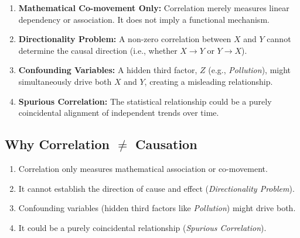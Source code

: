 \documentclass[12pt,a4paper]{article}
\begin{document}
\begin{tcolorbox}[
colback=gray!5,
colframe=black!75,
title=\textbf{Core Econometric Principle:
Correlation $\neq$ Causation},
fonttitle=\bfseries,
arc=2mm
]
\begin{enumerate}[label=\textbf{\arabic*.}]
\item \textbf{Mathematical Co-movement Only:} 
Correlation merely measures linear dependency or
association. It does not 
imply a functional mechanism.
\item \textbf{Directionality Problem:} 
A non-zero correlation between $X$ and $Y$
cannot determine the causal direction
(i.e., whether $X \rightarrow Y$ or $Y \rightarrow X$).
\item \textbf{Confounding Variables:} A hidden
third factor, $Z$ (e.g., \textit{Pollution}), might simultaneously drive
both $X$ and $Y$, creating a misleading relationship.
\item \textbf{Spurious Correlation:} The 
statistical relationship could be a purely coincidental alignment of independent
trends over time.
\end{enumerate}
\end{tcolorbox}
\vspace{1cm}
\subsection*{Why Correlation $\neq$ Causation}
\begin{enumerate}[label=\arabic*.]
\item Correlation only measures mathematical 
association or co-movement.
\item It cannot establish the direction of cause 
and effect (\textit{Directionality Problem}).
\item Confounding variables (hidden third factors like
\textit{Pollution}) might drive both.
\item It could be a purely coincidental relationship 
(\textit{Spurious Correlation}).
\end{enumerate}
\end{document}
